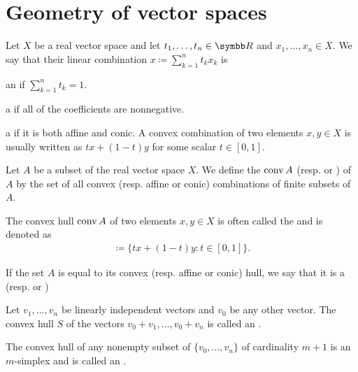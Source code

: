\section{Geometry of vector spaces}\label{sec:geometry_of_vector_spaces}

\begin{definition}\label{def:real_linear_combinations}
  Let $X$ be a real vector space and let $t_1, \ldots, t_n \in \BB{R}$ and $x_1, \ldots, x_n \in X$. We say that their linear combination $x \coloneqq \sum_{k=1}^n t_k x_k$ is

  \begin{defenum}
    \item\label{def:real_linear_combinations/affine} an  if $\sum_{k=1}^n t_k = 1$.
    \item\label{def:real_linear_combinations/conic} a  if all of the coefficients are nonnegative.
    \item\label{def:real_linear_combinations/convex} a  if it is both affine and conic. A convex combination of two elements $x, y \in X$ is usually written as $tx + (1-t)y$ for some scalar $t \in [0, 1]$.
  \end{defenum}
\end{definition}

\begin{definition}\label{def:linear_combination_hulls}
  Let $A$ be a subset of the real vector space $X$. We define the  $\operatorname{conv} A$ (resp.  or ) of $A$ by the set of all convex (resp. affine or conic) combinations of finite subsets of $A$.

  The convex hull $\operatorname{conv} A$ of two elements $x, y \in X$ is often called the  and is denoted as
  \begin{align*}
    [x, y] \coloneqq \{ tx + (1-t)y \colon t \in [0, 1] \}.
  \end{align*}

  If the set $A$ is equal to its convex (resp. affine or conic) hull, we say that it is a  (resp.  or )
\end{definition}

\begin{definition}\label{def:simplex}
  Let $v_1, \ldots, v_n$ be linearly independent vectors and $v_0$ be any other vector. The convex hull $S$ of the vectors $v_0 + v_1, \ldots, v_0 + v_n$ is called an .

  The convex hull of any nonempty subset of $\{ v_0, \ldots, v_n \}$ of cardinality $m + 1$ is an $m$-simplex and is called an .
\end{definition}
